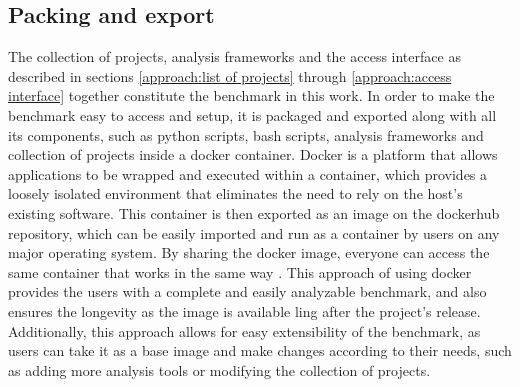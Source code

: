 \subsection{Packing and export}
\label{approach:packing and exporting}
The collection of projects, analysis frameworks and the access interface as described in sections \ref{approach:list of projects} through \ref{approach:access interface} together constitute the benchmark in this work.
In order to make the benchmark easy to access and setup, it is packaged and exported along with all its components, such as python scripts, bash scripts, analysis frameworks and collection of projects inside a docker container.
Docker is a platform that allows applications to be wrapped and executed within a container, which provides a loosely isolated environment that eliminates the need to rely on the host's existing software.
This container is then exported as an image on the dockerhub \cite{docker_hub} repository, which can be easily imported and run as a container by users on any major operating system. 
By sharing the docker image, everyone can access the same container that works in the same way \cite{Docker_2022}.
This approach of using docker provides the users with a complete and easily analyzable benchmark, and also ensures the longevity as the image is available ling after the project's release.
Additionally, this approach allows for easy extensibility of the benchmark, as users can take it as a base image and make changes according to their needs, such as adding more analysis tools or modifying the collection of projects.
